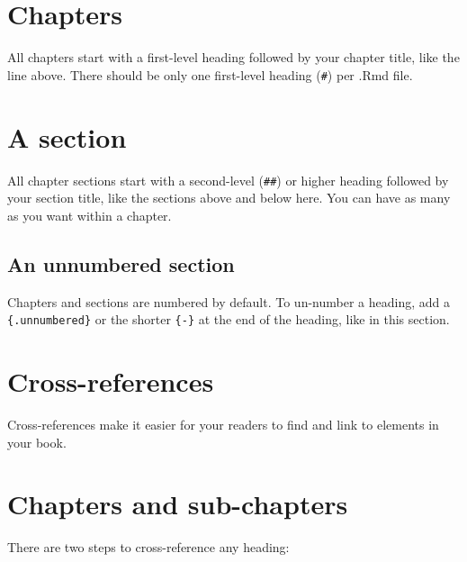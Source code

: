 \documentclass[
]{book}
\theoremstyle{definition}
\theoremstyle{definition}
\theoremstyle{definition}
\theoremstyle{definition}
\theoremstyle{remark}
\begin{document}
\section{Chapters}\label{chapters}

All chapters start with a first-level heading followed by your chapter title, like the line above. There should be only one first-level heading (\texttt{\#}) per .Rmd file.

\section{A section}\label{a-section}

All chapter sections start with a second-level (\texttt{\#\#}) or higher heading followed by your section title, like the sections above and below here. You can have as many as you want within a chapter.

\subsection*{An unnumbered section}\label{an-unnumbered-section}

Chapters and sections are numbered by default. To un-number a heading, add a \texttt{\{.unnumbered\}} or the shorter \texttt{\{-\}} at the end of the heading, like in this section.

\section{Cross-references}\label{cross}

Cross-references make it easier for your readers to find and link to elements in your book.

\section{Chapters and sub-chapters}\label{chapters-and-sub-chapters}

There are two steps to cross-reference any heading:
\end{document}
